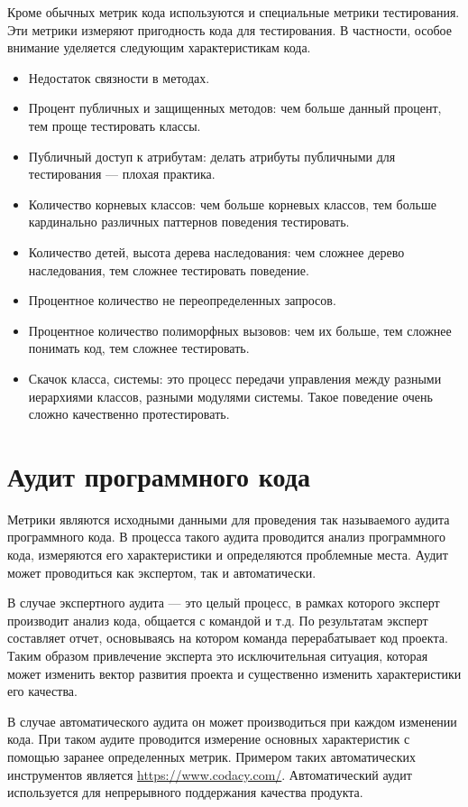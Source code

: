 \documentclass{../../text-style}
\begin{document}
Кроме обычных метрик кода используются и специальные метрики тестирования. Эти метрики измеряют пригодность кода для тестирования. В частности, особое внимание уделяется следующим характеристикам кода.

\begin{itemize}
    \item Недостаток связности в методах.
    \item Процент публичных и защищенных методов: чем больше данный процент, тем проще тестировать классы.
    \item Публичный доступ к атрибутам: делать атрибуты публичными для тестирования --- плохая практика.
    \item Количество корневых классов: чем больше корневых классов, тем больше кардинально различных паттернов поведения тестировать.
    \item Количество детей, высота дерева наследования: чем сложнее дерево наследования, тем сложнее тестировать поведение.
    \item Процентное количество не переопределенных запросов. 
    \item Процентное количество полиморфных вызовов: чем их больше, тем сложнее понимать код, тем сложнее тестировать.
    \item Скачок класса, системы: это процесс передачи управления между разными иерархиями классов, разными модулями системы. Такое поведение очень сложно качественно протестировать.
\end{itemize}

\section{Аудит программного кода}

Метрики являются исходными данными для проведения так называемого аудита программного кода. В процесса такого аудита проводится анализ программного кода, измеряются его характеристики и определяются проблемные места. Аудит может проводиться как экспертом, так и автоматически.

В случае экспертного аудита --- это целый процесс, в рамках которого эксперт производит анализ кода, общается с командой и т.д. По результатам эксперт составляет отчет, основываясь на котором команда перерабатывает код проекта. Таким образом привлечение эксперта это исключительная ситуация, которая может изменить вектор развития проекта и существенно изменить характеристики его качества.

В случае автоматического аудита он может производиться при каждом изменении кода. При таком аудите проводится измерение основных характеристик с помощью заранее определенных метрик. Примером таких автоматических инструментов является \url{https://www.codacy.com/}. Автоматический аудит используется для непрерывного поддержания качества продукта.
\end{document}

